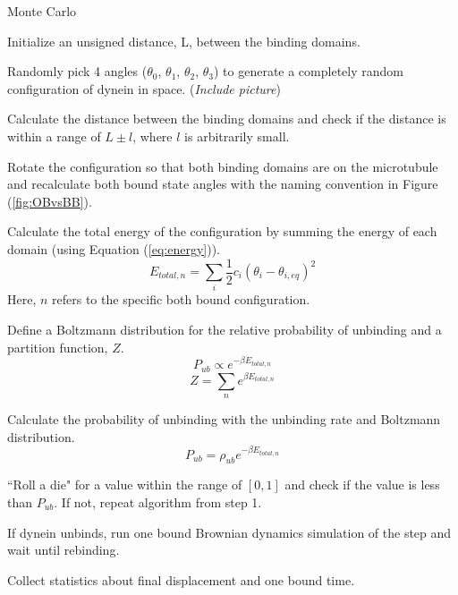 \begin{algorithm}[H]
	\caption{Monte Carlo}
	\label{alg:MonteCarlo}

	\begin{alg}
	\item Initialize an unsigned distance, L, between the binding domains.
	
	\item Randomly pick 4 angles ($\theta_0$, $\theta_1$, $\theta_2$, $\theta_3$) to generate a completely random configuration of dynein in space. (\textit{Include picture})
	
	\item Calculate the distance between the binding domains and check if the distance is within a range of $L\pm l$, where $l$ is arbitrarily small.
	
	\item Rotate the configuration so that both binding domains are on the microtubule and recalculate both bound state angles with the naming convention in Figure (\ref{fig:OBvsBB}).
	
	\item Calculate the total energy of the configuration by summing the energy of each domain (using Equation (\ref{eq:energy})).
	\begin{equation}
		E_{total, n}=\sum_{i}\frac{1}{2}c_i(\theta_i-\theta_{i,eq})^2
	\end{equation}
	Here, $n$ refers to the specific both bound configuration.	
	
	\item Define a Boltzmann distribution for the relative probability of unbinding and a partition function, $Z$.
	\begin{equation}
		P_{ub}\propto e^{-\beta E_{total, n}}
	\end{equation}
	\begin{equation}
		Z=\sum_{n}e^{\beta E_{total, n}}
	\end{equation}
	
	\item Calculate the probability of unbinding with the unbinding rate and Boltzmann distribution.
	\begin{equation}
		P_{ub} = \rho_{ub}e^{-\beta E_{total, n}}
	\end{equation}
	
	\item ``Roll a die" for a value within the range of $[0,1]$ and check if the value is less than $P_{ub}$. If not, repeat algorithm from step 1.
	
	\item If dynein unbinds, run one bound Brownian dynamics simulation of the step and wait until rebinding.
	
	\item Collect statistics about final displacement and one bound time. 	
	
	\end{alg}

\end{algorithm}

